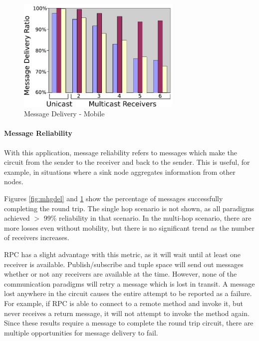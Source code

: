 \begin{figure}
\centering
\includegraphics[width = 0.70\textwidth, clip, trim = 0px 0px 0px 0px]{figures/mobile-group-delivery.pdf}
\caption{Message Delivery - Mobile}
\label{fig:mgdel}
\end{figure}


\paragraph{Message Reliability}\label{sec:group_reliability}

With this application, message reliability refers to messages which make the circuit from the sender to the receiver and back to the sender. This is useful, for example, in situations where a sink node aggregates information from other nodes.

Figures \ref{fig:mhgdel} and \ref{fig:mgdel} show the percentage of messages successfully completing the round trip. The single hop scenario is not shown, as all paradigms achieved $>$ 99\% reliability in that scenario. In the multi-hop scenario, there are more losses even without mobility, but there is no significant trend as the number of receivers increases.

RPC has a slight advantage with this metric, as it will wait until at least one receiver is available. Publish/subscribe and tuple space will send out messages whether or not any receivers are available at the time. However, none of the communication paradigms will retry a message which is lost in transit. A message lost anywhere in the circuit causes the entire attempt to be reported as a failure. For example, if RPC is able to connect to a remote method and invoke it, but never receives a return message, it will not attempt to invoke the method again. Since these results require a message to complete the round trip circuit, there are multiple opportunities for message delivery to fail. 

